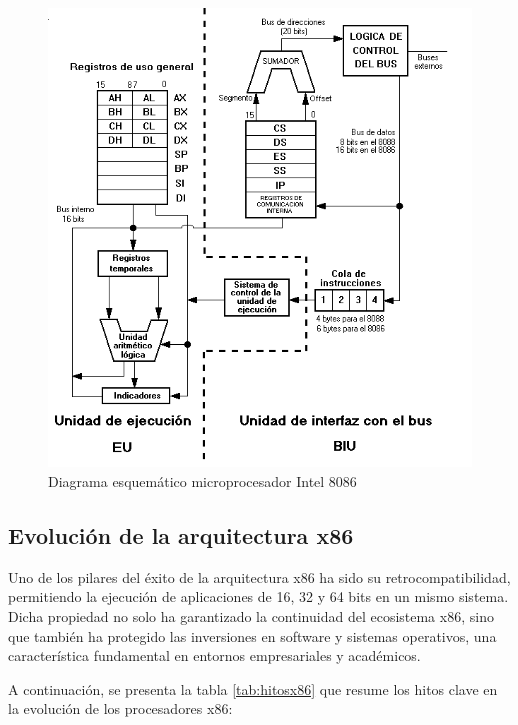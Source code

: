 \documentclass[12pt,oneside]{templates/unerthesis}
\begin{document}
\begin{figure}

{\centering \includegraphics[width=1\linewidth]{images/x86} 

}

\caption{Diagrama esquemático microprocesador Intel 8086}\label{fig:x86}
\end{figure}

\hypertarget{evoluciuxf3n-de-la-arquitectura-x86}{%
\subsection{Evolución de la arquitectura x86}\label{evoluciuxf3n-de-la-arquitectura-x86}}

Uno de los pilares del éxito de la arquitectura x86 ha sido su retrocompatibilidad, permitiendo la ejecución de aplicaciones de 16, 32 y 64 bits en un mismo sistema. Dicha propiedad no solo ha garantizado la continuidad del ecosistema x86, sino que también ha protegido las inversiones en software y sistemas operativos, una característica fundamental en entornos empresariales y académicos.

A continuación, se presenta la tabla \ref{tab:hitosx86} que resume los hitos clave en la evolución de los procesadores x86:
\end{document}
